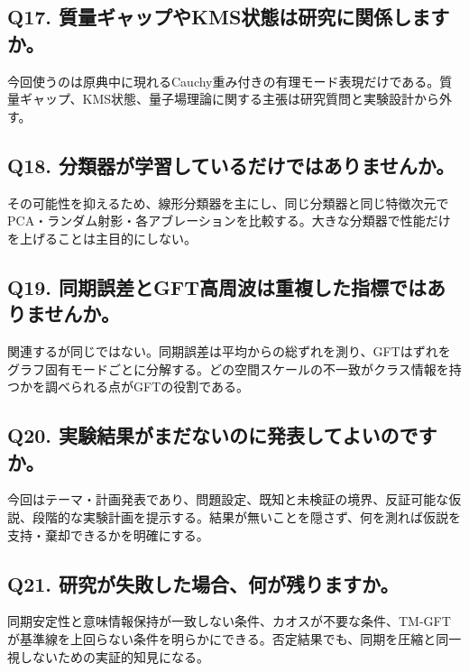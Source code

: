 \documentclass[11pt,a4paper]{ltjsarticle}
\begin{document}
\subsection*{\textcolor{researchblue}{Q17. 質量ギャップやKMS状態は研究に関係しますか。}}

今回使うのは原典中に現れるCauchy重み付きの有理モード表現だけである。質量ギャップ、KMS状態、量子場理論に関する主張は研究質問と実験設計から外す。\par

\subsection*{\textcolor{researchblue}{Q18. 分類器が学習しているだけではありませんか。}}

その可能性を抑えるため、線形分類器を主にし、同じ分類器と同じ特徴次元でPCA・ランダム射影・各アブレーションを比較する。大きな分類器で性能だけを上げることは主目的にしない。\par

\subsection*{\textcolor{researchblue}{Q19. 同期誤差とGFT高周波は重複した指標ではありませんか。}}

関連するが同じではない。同期誤差は平均からの総ずれを測り、GFTはずれをグラフ固有モードごとに分解する。どの空間スケールの不一致がクラス情報を持つかを調べられる点がGFTの役割である。\par

\subsection*{\textcolor{researchblue}{Q20. 実験結果がまだないのに発表してよいのですか。}}

今回はテーマ・計画発表であり、問題設定、既知と未検証の境界、反証可能な仮説、段階的な実験計画を提示する。結果が無いことを隠さず、何を測れば仮説を支持・棄却できるかを明確にする。\par

\subsection*{\textcolor{researchblue}{Q21. 研究が失敗した場合、何が残りますか。}}

同期安定性と意味情報保持が一致しない条件、カオスが不要な条件、TM-GFTが基準線を上回らない条件を明らかにできる。否定結果でも、同期を圧縮と同一視しないための実証的知見になる。\par
\end{document}
